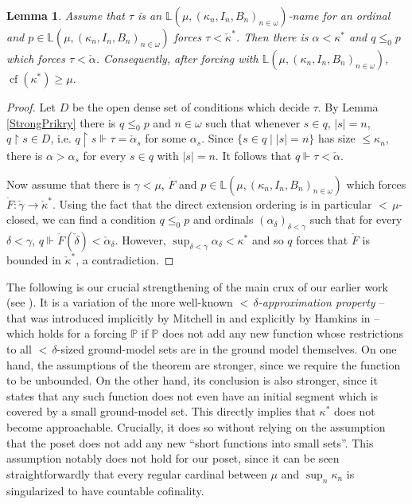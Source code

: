 \documentclass[a4paper]{amsart}
\theoremstyle{definition}
\theoremstyle{remark}
\theoremstyle{plain}
\newtheorem{mylem}[mydef]{Lemma}
\numberwithin{mydef}{section}
\DeclareMathOperator{\cf}{cf}
\newcommand{\dL}{\mathbb{L}}
\newcommand{\dP}{\mathbb{P}}
\newcommand{\uhr}{\upharpoonright}
\begin{document}
	\begin{mylem}\label{KappaStarCof}
		Assume that $\tau$ is an $\dL(\mu,(\kappa_n,I_n,B_n)_{n\in\omega})$-name for an ordinal and $p\in\dL(\mu,(\kappa_n,I_n,B_n)_{n\in\omega})$ forces $\tau<\check{\kappa}^*$. Then there is $\alpha<\kappa^*$ and $q\leq_0p$ which forces $\tau<\check{\alpha}$. Consequently, after forcing with $\dL(\mu,(\kappa_n,I_n,B_n)_{n\in\omega})$, $\cf(\kappa^*)\geq\mu$.
	\end{mylem}
	
	\begin{proof}
		Let $D$ be the open dense set of conditions which decide $\tau$. By Lemma \ref{StrongPrikry} there is $q\leq_0p$ and $n\in\omega$ such that whenever $s\in q$, $|s|=n$, $q\uhr s\in D$, i.e. $q\uhr s\Vdash\tau=\check{\alpha}_s$ for some $\alpha_s$. Since $\{s\in q\;|\;|s|=n\}$ has size $\leq\kappa_n$, there is $\alpha>\alpha_s$ for every $s\in q$ with $|s|=n$. It follows that $q\Vdash\tau<\check{\alpha}$.
		
		Now assume that there is $\gamma<\mu$, $\dot{F}$ and $p\in\dL(\mu,(\kappa_n,I_n,B_n)_{n\in\omega})$ which forces $\dot{F}\colon\check{\gamma}\to\check{\kappa}^*$. Using the fact that the direct extension ordering is in particular ${<}\,\mu$-closed, we can find a condition $q\leq_0p$ and ordinals $(\alpha_{\delta})_{\delta<\gamma}$ such that for every $\delta<\gamma$, $q\Vdash\dot{F}(\check{\delta})<\check{\alpha}_{\delta}$. However, $\sup_{\delta<\gamma}\alpha_{\delta}<\kappa^*$ and so $q$ forces that $\dot{F}$ is bounded in $\check{\kappa}^*$, a contradiction.
	\end{proof}
	
	The following is our crucial strengthening of the main crux of our earlier work (see \cite[Theorem 4.3]{JakobLevineFailureApproachability}). It is a variation of the more well-known \emph{${<}\,\delta$-approximation property} -- that was introduced implicitly by Mitchell in \cite{MitchellTreeProp} and explicitly by Hamkins in \cite{HamkinsExtApprox} -- which holds for a forcing $\dP$ if $\dP$ does not add any new function whose restrictions to all ${<}\,\delta$-sized ground-model sets are in the ground model themselves. On one hand, the assumptions of the theorem are stronger, since we require the function to be unbounded. On the other hand, its conclusion is also stronger, since it states that any such function does not even have an initial segment which is covered by a small ground-model set. This directly implies that $\kappa^*$ does not become approachable. Crucially, it does so without relying on the assumption that the poset does not add any new ``short functions into small sets''. This assumption notably does not hold for our poset, since it can be seen straightforwardly that every regular cardinal between $\mu$ and $\sup_n\kappa_n$ is singularized to have countable cofinality.
	
\end{document}
